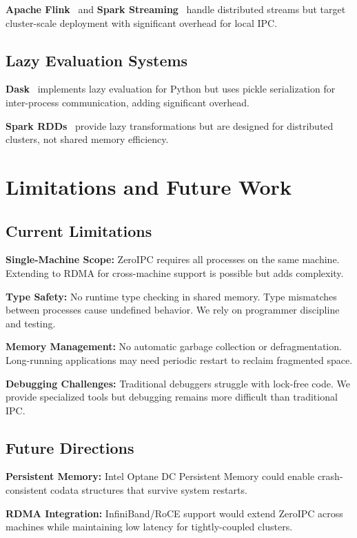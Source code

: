 \documentclass[11pt]{article}
\begin{document}
\textbf{Apache Flink}~\cite{flink} and \textbf{Spark Streaming}~\cite{spark_streaming} handle distributed streams but target cluster-scale deployment with significant overhead for local IPC.

\subsection{Lazy Evaluation Systems}

\textbf{Dask}~\cite{dask} implements lazy evaluation for Python but uses pickle serialization for inter-process communication, adding significant overhead.

\textbf{Spark RDDs}~\cite{spark} provide lazy transformations but are designed for distributed clusters, not shared memory efficiency.

\section{Limitations and Future Work}

\subsection{Current Limitations}

\textbf{Single-Machine Scope:} ZeroIPC requires all processes on the same machine. Extending to RDMA for cross-machine support is possible but adds complexity.

\textbf{Type Safety:} No runtime type checking in shared memory. Type mismatches between processes cause undefined behavior. We rely on programmer discipline and testing.

\textbf{Memory Management:} No automatic garbage collection or defragmentation. Long-running applications may need periodic restart to reclaim fragmented space.

\textbf{Debugging Challenges:} Traditional debuggers struggle with lock-free code. We provide specialized tools but debugging remains more difficult than traditional IPC.

\subsection{Future Directions}

\textbf{Persistent Memory:} Intel Optane DC Persistent Memory could enable crash-consistent codata structures that survive system restarts.

\textbf{RDMA Integration:} InfiniBand/RoCE support would extend ZeroIPC across machines while maintaining low latency for tightly-coupled clusters.
\end{document}
